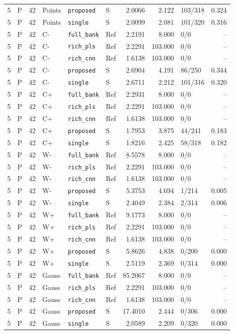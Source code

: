 \documentclass[10pt,a4paper]{article}
\begin{document}
\begin{landscape}
\begin{longtable}{rlrlllrrlr}
5 & P & 42 & Points & \texttt{proposed} & S & 2.0066 & 2.122 & 103/318 & 0.324 \\
5 & P & 42 & Points & \texttt{single} & S & 2.0099 & 2.081 & 101/320 & 0.316 \\
5 & P & 42 & C- & \texttt{full\_bank} & Ref & 2.2191 & 8.000 & 0/0 & -- \\
5 & P & 42 & C- & \texttt{rich\_pls} & Ref & 2.2291 & 103.000 & 0/0 & -- \\
5 & P & 42 & C- & \texttt{rich\_cnn} & Ref & 1.6138 & 103.000 & 0/0 & -- \\
5 & P & 42 & C- & \texttt{proposed} & S & 2.6904 & 4.191 & 86/250 & 0.344 \\
5 & P & 42 & C- & \texttt{single} & S & 2.6711 & 2.212 & 101/316 & 0.320 \\
5 & P & 42 & C+ & \texttt{full\_bank} & Ref & 2.2931 & 8.000 & 0/0 & -- \\
5 & P & 42 & C+ & \texttt{rich\_pls} & Ref & 2.2291 & 103.000 & 0/0 & -- \\
5 & P & 42 & C+ & \texttt{rich\_cnn} & Ref & 1.6138 & 103.000 & 0/0 & -- \\
5 & P & 42 & C+ & \texttt{proposed} & S & 1.7953 & 3.875 & 44/241 & 0.183 \\
5 & P & 42 & C+ & \texttt{single} & S & 1.8216 & 2.425 & 58/318 & 0.182 \\
5 & P & 42 & W- & \texttt{full\_bank} & Ref & 8.5578 & 8.000 & 0/0 & -- \\
5 & P & 42 & W- & \texttt{rich\_pls} & Ref & 2.2291 & 103.000 & 0/0 & -- \\
5 & P & 42 & W- & \texttt{rich\_cnn} & Ref & 1.6138 & 103.000 & 0/0 & -- \\
5 & P & 42 & W- & \texttt{proposed} & S & 5.3753 & 4.694 & 1/214 & 0.005 \\
5 & P & 42 & W- & \texttt{single} & S & 2.4049 & 2.384 & 2/314 & 0.006 \\
5 & P & 42 & W+ & \texttt{full\_bank} & Ref & 9.1773 & 8.000 & 0/0 & -- \\
5 & P & 42 & W+ & \texttt{rich\_pls} & Ref & 2.2291 & 103.000 & 0/0 & -- \\
5 & P & 42 & W+ & \texttt{rich\_cnn} & Ref & 1.6138 & 103.000 & 0/0 & -- \\
5 & P & 42 & W+ & \texttt{proposed} & S & 5.8626 & 4.838 & 0/200 & 0.000 \\
5 & P & 42 & W+ & \texttt{single} & S & 2.5119 & 2.369 & 0/314 & 0.000 \\
5 & P & 42 & Gauss & \texttt{full\_bank} & Ref & 85.2067 & 8.000 & 0/0 & -- \\
5 & P & 42 & Gauss & \texttt{rich\_pls} & Ref & 2.2291 & 103.000 & 0/0 & -- \\
5 & P & 42 & Gauss & \texttt{rich\_cnn} & Ref & 1.6138 & 103.000 & 0/0 & -- \\
5 & P & 42 & Gauss & \texttt{proposed} & S & 17.4010 & 2.444 & 0/306 & 0.000 \\
5 & P & 42 & Gauss & \texttt{single} & S & 2.0589 & 2.209 & 0/320 & 0.000 \\
\end{longtable}
\endgroup
\end{landscape}
\end{document}
